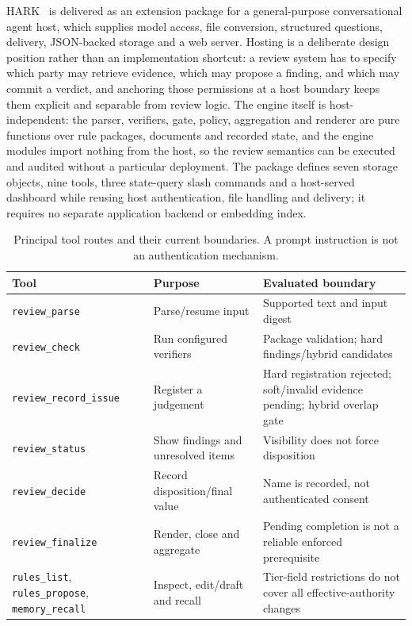 \documentclass[computers,article,submit,moreauthors]{Definitions/mdpi}
\begin{document}
HARK~\cite{artifact} is delivered as an extension package for a general-purpose conversational agent host, which supplies model access, file conversion, structured questions, delivery, JSON-backed storage and a web server. Hosting is a deliberate design position rather than an implementation shortcut: a review system has to specify which party may retrieve evidence, which may propose a finding, and which may commit a verdict, and anchoring those permissions at a host boundary keeps them explicit and separable from review logic. The engine itself is host-independent: the parser, verifiers, gate, policy, aggregation and renderer are pure functions over rule packages, documents and recorded state, and the engine modules import nothing from the host, so the review semantics can be executed and audited without a particular deployment. The package defines seven storage objects, nine tools, three state-query slash commands and a host-served dashboard while reusing host authentication, file handling and delivery; it requires no separate application backend or embedding index.

\begin{table}[!ht]
\caption{Principal tool routes and their current boundaries. A prompt instruction is not an authentication mechanism.}
\label{tab:tools}
\centering\footnotesize
\begin{tabularx}{\textwidth}{@{}p{3.4cm}XX@{}}
\toprule
Tool & Purpose & Evaluated boundary \\
\midrule
\texttt{review\_parse} & Parse/resume input & Supported text and input digest \\
\texttt{review\_check} & Run configured verifiers & Package validation; hard findings/hybrid candidates \\
\texttt{review\_record\_issue} & Register a judgement & Hard registration rejected; soft/invalid evidence pending; hybrid overlap gate \\
\texttt{review\_status} & Show findings and unresolved items & Visibility does not force disposition \\
\texttt{review\_decide} & Record disposition/final value & Name is recorded, not authenticated consent \\
\texttt{review\_finalize} & Render, close and aggregate & Pending completion is not a reliable enforced prerequisite \\
\texttt{rules\_list}, \texttt{rules\_propose}, \texttt{memory\_recall} & Inspect, edit/draft and recall & Tier-field restrictions do not cover all effective-authority changes \\
\bottomrule
\end{tabularx}
\end{table}
\end{document}
